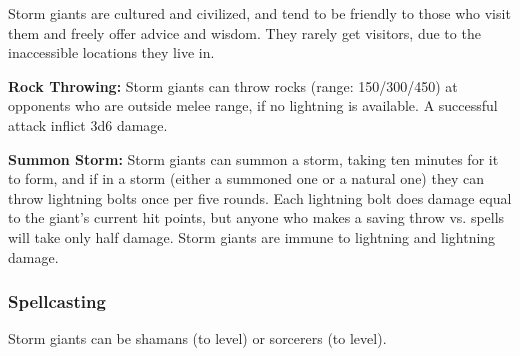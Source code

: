 \begin{multicols*}{2}
Storm giants are cultured and civilized, and tend to be friendly to those who visit them and freely offer advice and wisdom. They rarely get visitors, due to the inaccessible locations they live in.

\textbf{Rock Throwing:} Storm giants can throw rocks (range: 150/300/450) at opponents who are outside melee range, if no lightning is available. A successful attack inflict 3d6 damage.

\textbf{Summon Storm:} Storm giants can summon a storm, taking ten minutes for it to form, and if in a storm (either a summoned one or a natural one) they can throw lightning bolts once per five rounds. Each lightning bolt does damage equal to the giant’s current hit points, but anyone who makes a saving throw vs. spells will take only half damage. Storm giants are immune to lightning and lightning damage.

\subsubsection{Spellcasting}
Storm giants can be shamans (to  level) or sorcerers (to  level).


\end{multicols*}
